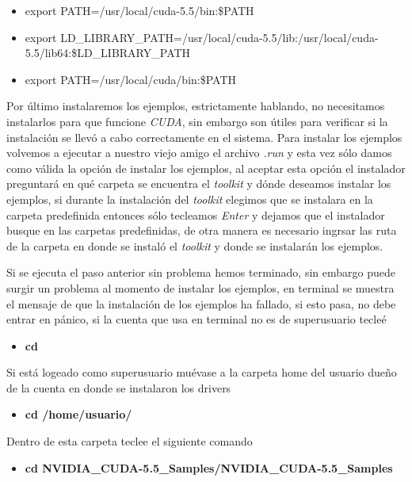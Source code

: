 \documentclass{article}
\begin{document}
\begin{itemize}
\itemsep1pt\parskip0pt
\item
  export PATH=/usr/local/cuda-5.5/bin:\$PATH
\item
  export
  LD\_LIBRARY\_PATH=/usr/local/cuda-5.5/lib:/usr/local/cuda-5.5/lib64:\$LD\_LIBRARY\_PATH
\item
  export PATH=/usr/local/cuda/bin:\$PATH
\end{itemize}

Por último instalaremos los ejemplos, estrictamente hablando, no
necesitamos instalarlos para que funcione \emph{CUDA}, sin embargo son
útiles para verificar si la instalación se llevó a cabo correctamente en
el sistema. Para instalar los ejemplos volvemos a ejecutar a nuestro
viejo amigo el archivo \emph{.run} y esta vez sólo damos como válida la
opción de instalar los ejemplos, al aceptar esta opción el instalador
preguntará en qué carpeta se encuentra el \emph{toolkit} y dónde
deseamos instalar los ejemplos, si durante la instalación del
\emph{toolkit} elegimos que se instalara en la carpeta predefinida
entonces sólo tecleamos \emph{Enter} y dejamos que el instalador busque
en las carpetas predefinidas, de otra manera es necesario ingrsar las
ruta de la carpeta en donde se instaló el \emph{toolkit} y donde se
instalarán los ejemplos.

Si se ejecuta el paso anterior sin problema hemos terminado, sin embargo
puede surgir un problema al momento de instalar los ejemplos, en
terminal se muestra el mensaje de que la instalación de los ejemplos ha
fallado, si esto pasa, no debe entrar en pánico, si la cuenta que usa en
terminal no es de superusuario tecleé

\begin{itemize}
\itemsep1pt\parskip0pt
\item
  \textbf{cd}
\end{itemize}

Si está logeado como superusuario muévase a la carpeta home del usuario
dueño de la cuenta en donde se instalaron los drivers

\begin{itemize}
\itemsep1pt\parskip0pt
\item
  \textbf{cd /home/usuario/}
\end{itemize}

Dentro de esta carpeta teclee el siguiente comando

\begin{itemize}
\itemsep1pt\parskip0pt
\item
  \textbf{cd NVIDIA\_CUDA-5.5\_Samples/NVIDIA\_CUDA-5.5\_Samples}
\end{itemize}
\end{document}
